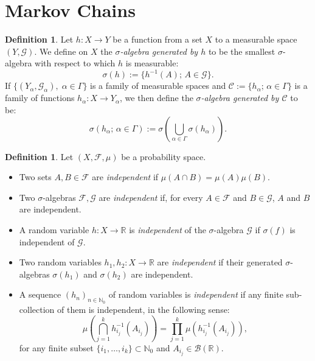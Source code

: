 \documentclass[a4paper]{article}
\theoremstyle{plain}
\theoremstyle{definition}
\newtheorem{defn}[theorem]{Definition}%
\newcommand{\R}{\mathbb{R}}
\newcommand{\N}{\mathbb{N}}
\begin{document}
	
	
	
	
	\section{Markov Chains}
	
	
	\begin{defn}
		Let $h: X \to Y$ be a function from a set $X$ to a measurable space $(Y,\mathcal{G})$. We define on $X$ the \textit{$\sigma$-algebra generated by $h$} to be the smallest $\sigma$-algebra with respect to which $h$ is measurable:
		\begin{equation*}
			\sigma(h) := \{h^{-1}(A);\, A \in \mathcal{G}\}.
		\end{equation*}
		If $\{(Y_{\alpha},\mathcal{G}_{\alpha}),\; \alpha \in \Gamma\}$ is a family of measurable spaces and $\mathcal{C} := \{h_{\alpha};\, \alpha \in \Gamma\}$ is a family of functions $h_{\alpha}: X \to Y_{\alpha}$, we then define the \textit{$\sigma$-algebra generated by $\mathcal{C}$} to be:
		\begin{equation*}
			\sigma(h_{\alpha};\, \alpha \in \Gamma) := \sigma\left(\bigcup_{\alpha\in\Gamma}\sigma(h_{\alpha})\right).
		\end{equation*}
	\end{defn}


    \begin{defn}\label{definition independence}
        Let $(X, \mathcal{F}, \mu)$ be a probability space.
        \begin{itemize}
            \item Two sets $A, B \in \mathcal{F}$ are \textit{independent} if $\mu(A\cap B) = \mu(A)\mu(B)$.
            \item Two $\sigma$-algebras $\mathcal{F}, \mathcal{G}$ are \textit{independent} if, for every $A \in \mathcal{F}$ and $B \in \mathcal{G}$, $A$ and $B$ are independent.
            \item A random variable $h: X \to \R$ is \textit{independent} of the $\sigma$-algebra $\mathcal{G}$ if $\sigma(f)$ is independent of $\mathcal{G}$.
            \item Two random variables $h_{1},h_{2}: X \to \R$ are \textit{independent} if their generated $\sigma$-algebras $\sigma(h_{1})$ and $\sigma(h_{2})$ are independent.
            \item A sequence $(h_{n})_{n\in\N_{0}}$ of random variables is \textit{independent} if any finite sub-collection of them is independent, in the following sense:
            \begin{equation*}
                \mu\left(\bigcap\limits_{j=1}^{k}h_{i_{j}}^{-1}(A_{i_{j}})\right) = \prod\limits_{j=1}^{k}\mu\left(h_{i_{j}}^{-1}(A_{i_{j}})\right),
            \end{equation*}
            for any finite subset $\{i_{1},\dots,i_{k}\} \subset \N_{0}$ and $A_{i_{j}} \in \mathcal{B}(\R)$.
        \end{itemize}
    \end{defn}
\end{document}
